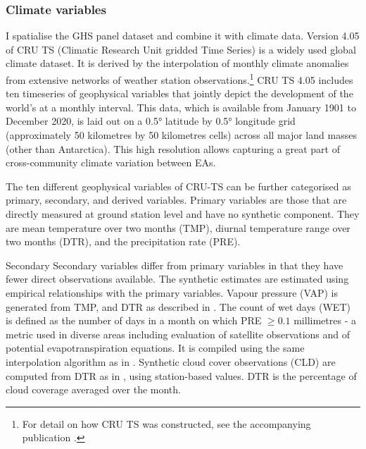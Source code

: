 \documentclass[a4paper,12pt]{article}
\theoremstyle{plain}
\theoremstyle{definition}
\theoremstyle{definition}
\theoremstyle{definition}
\theoremstyle{definition}
\begin{document}
\subsubsection{Climate variables}
\label{subsub:climatevars}

I spatialise the GHS panel dataset and combine it with climate data. Version 4.05 of CRU TS (Climatic Research Unit gridded Time Series) is a widely used global climate dataset. It is derived by the interpolation of monthly climate anomalies from extensive networks of weather station observations.\footnote{For detail on how CRU TS was constructed, see the accompanying publication \citep{harris2020}.} CRU TS 4.05 includes ten timeseries of geophysical variables that jointly depict the development of the world's at a monthly interval. This data, which is available from January 1901 to December 2020, is laid out on a 0.5° latitude by 0.5° longitude grid (approximately 50 kilometres by 50 kilometres cells) across all major land masses (other than Antarctica). This high resolution allows capturing a great part of cross-community climate variation between EAs.

The ten different geophysical variables of CRU-TS can be further categorised as primary, secondary, and derived variables. Primary variables are those that are directly measured at ground station level and have no synthetic component. They are mean temperature over two months (TMP), diurnal temperature range over two months (DTR), and the precipitation rate (PRE).

Secondary Secondary variables differ from primary variables in that they have fewer direct observations available. The synthetic estimates are estimated using empirical relationships with the primary variables. Vapour pressure (VAP) is generated from TMP, and DTR as described in \citet{harris2020}. The count of wet days (WET) is defined as the number of days in a month on which PRE $\geq0.1$ millimetres - a metric used in diverse areas including evaluation of satellite observations and of potential evapotranspiration equations. It is compiled using the same interpolation algorithm as in \citet{harris2014}. Synthetic cloud cover observations (CLD) are computed from DTR as in \citet{harris2014}, using station-based values. DTR is the percentage of cloud coverage averaged over the month.
\end{document}
